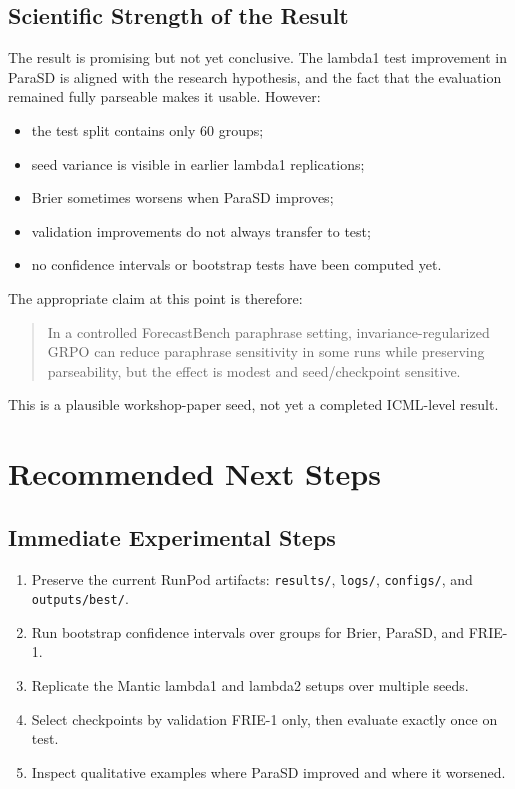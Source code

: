 \documentclass[11pt]{article}
\begin{document}
\subsection{Scientific Strength of the Result}

The result is promising but not yet conclusive. The lambda1 test improvement in
ParaSD is aligned with the research hypothesis, and the fact that the evaluation
remained fully parseable makes it usable. However:

\begin{itemize}
  \item the test split contains only 60 groups;
  \item seed variance is visible in earlier lambda1 replications;
  \item Brier sometimes worsens when ParaSD improves;
  \item validation improvements do not always transfer to test;
  \item no confidence intervals or bootstrap tests have been computed yet.
\end{itemize}

The appropriate claim at this point is therefore:

\begin{quote}
In a controlled ForecastBench paraphrase setting, invariance-regularized GRPO
can reduce paraphrase sensitivity in some runs while preserving parseability,
but the effect is modest and seed/checkpoint sensitive.
\end{quote}

This is a plausible workshop-paper seed, not yet a completed ICML-level result.

\section{Recommended Next Steps}

\subsection{Immediate Experimental Steps}

\begin{enumerate}
  \item Preserve the current RunPod artifacts: \texttt{results/}, \texttt{logs/},
  \texttt{configs/}, and \texttt{outputs/best/}.
  \item Run bootstrap confidence intervals over groups for Brier, ParaSD, and
  FRIE-1.
  \item Replicate the Mantic lambda1 and lambda2 setups over multiple seeds.
  \item Select checkpoints by validation FRIE-1 only, then evaluate exactly once
  on test.
  \item Inspect qualitative examples where ParaSD improved and where it worsened.
\end{enumerate}
\end{document}
